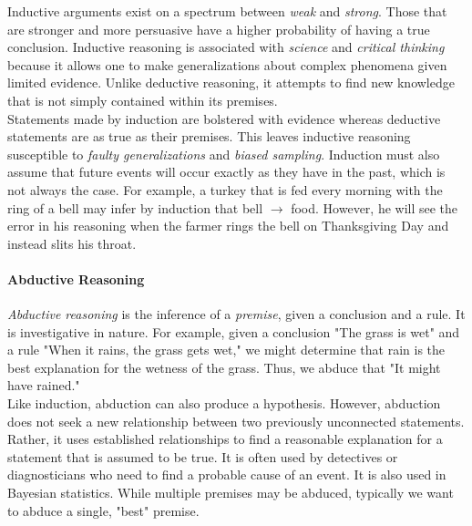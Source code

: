 
Inductive arguments exist on a spectrum between \textit{weak} and \textit{strong}. Those that are stronger and more persuasive have a higher probability of having a true conclusion. Inductive reasoning is associated with \textit{science} and \textit{critical thinking} because it allows one to make generalizations about complex phenomena given limited evidence. Unlike deductive reasoning, it attempts to find new knowledge that is not simply contained within its premises. \\

Statements made by induction are bolstered with evidence whereas deductive statements are as true as their premises. This leaves inductive reasoning susceptible to \textit{faulty generalizations} and \textit{biased sampling}. Induction must also assume that future events will occur exactly as they have in the past, which is not always the case. For example, a turkey that is fed every morning with the ring of a bell may infer by induction that bell $\rightarrow$ food. However, he will see the error in his reasoning when the farmer rings the bell on Thanksgiving Day and instead slits his throat. \\

\paragraph{Abductive Reasoning} \hspace*{1mm} \vspace*{2mm}

\textit{Abductive reasoning} is the inference of a \textit{premise}, given a conclusion and a rule. It is investigative in nature. For example, given a conclusion "The grass is wet" and a rule "When it rains, the grass gets wet," we might determine that rain is the best explanation for the wetness of the grass. Thus, we abduce that "It might have rained." \\

Like induction, abduction can also produce a hypothesis. However, abduction does not seek a new relationship between two previously unconnected statements. Rather, it uses established relationships to find a reasonable explanation for a statement that is assumed to be true. It is often used by detectives or diagnosticians who need to find a probable cause of an event. It is also used in Bayesian statistics. While multiple premises may be abduced, typically we want to abduce a single, "best" premise. \\

